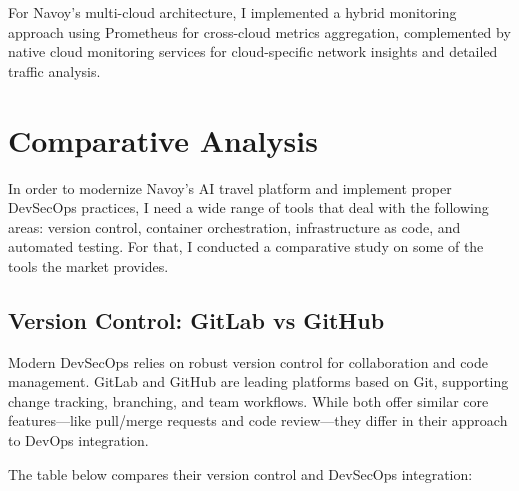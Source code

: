 For Navoy's multi-cloud architecture, I implemented a hybrid monitoring approach using Prometheus for cross-cloud metrics aggregation, complemented by native cloud monitoring services for cloud-specific network insights and detailed traffic analysis.

\section{Comparative Analysis}
In order to modernize Navoy's AI travel platform and implement proper DevSecOps practices, I need a wide range of tools that deal with the following areas: version control, container orchestration, infrastructure as code, and automated testing. For that, I conducted a comparative study on some of the tools the market provides.

\subsection{Version Control: GitLab vs GitHub}
Modern DevSecOps relies on robust version control for collaboration and code management. GitLab and GitHub are leading platforms based on Git, supporting change tracking, branching, and team workflows. While both offer similar core features—like pull/merge requests and code review—they differ in their approach to DevOps integration.

The table below compares their version control and DevSecOps integration:

